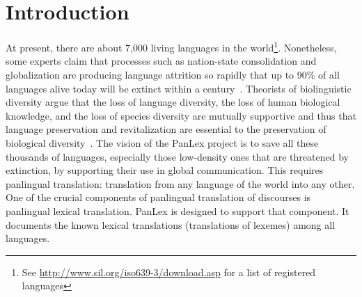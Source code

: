 \documentclass[sw]{iosart2c}
\newcommand*{\origtodo}{}
\let\origtodo\todo
\renewcommand*{\todo}{\origtodo[inline]}
\begin{document}
\section{Introduction}
At present, there are about 7,000 living languages in the world\footnote{See \url{http://www.sil.org/iso639-3/download.asp} for a list of registered languages}.
Nonetheless, some experts claim that processes such as nation-state consolidation and globalization are producing language attrition so rapidly that up to 90\% of all languages alive today will be extinct within a century~\cite{endang_lang}.
Theorists of biolinguistic diversity argue that the loss of
language diversity, the loss of human biological knowledge, and the loss of
species diversity are mutually supportive and thus that language preservation
and revitalization are essential to the preservation of biological diversity~\cite{nettle}.
The vision of the PanLex project is to save all these thousands of languages,
especially those low-density ones that are threatened by extinction,
by supporting their use in global communication. This requires panlingual
translation: translation from any language of the world into any other.
One of the crucial components of panlingual translation of discourses is
panlingual lexical translation. PanLex is designed to support that component.
It documents the known lexical translations (translations of lexemes) among all
languages.
 
\end{document}
